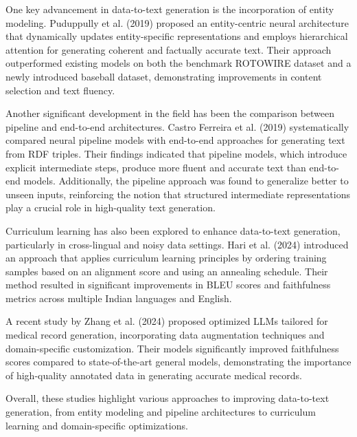 \documentclass[fleqn,moreauthors,10pt]{ds_report}
\begin{document}
One key advancement in data-to-text generation is the incorporation of entity modeling. Puduppully et al. (2019) \cite{puduppully2019datatotextgenerationentitymodeling} proposed an entity-centric neural architecture that dynamically updates entity-specific representations and employs hierarchical attention for generating coherent and factually accurate text. Their approach outperformed existing models on both the benchmark ROTOWIRE dataset and a newly introduced baseball dataset, demonstrating improvements in content selection and text fluency.

Another significant development in the field has been the comparison between pipeline and end-to-end architectures. Castro Ferreira et al. (2019) \cite{ferreira2019neuraldatatotextgenerationcomparison} systematically compared neural pipeline models with end-to-end approaches for generating text from RDF triples. Their findings indicated that pipeline models, which introduce explicit intermediate steps, produce more fluent and accurate text than end-to-end models. Additionally, the pipeline approach was found to generalize better to unseen inputs, reinforcing the notion that structured intermediate representations play a crucial role in high-quality text generation.

Curriculum learning has also been explored to enhance data-to-text generation, particularly in cross-lingual and noisy data settings. Hari et al. (2024) \cite{hari2024curriculumlearningcrosslingualdatatotext} introduced an approach that applies curriculum learning principles by ordering training samples based on an alignment score and using an annealing schedule. Their method resulted in significant improvements in BLEU scores and faithfulness metrics across multiple Indian languages and English.

A recent study by Zhang et al. (2024) \cite{zhang2025data} proposed optimized LLMs tailored for medical record generation, incorporating data augmentation techniques and domain-specific customization. Their models significantly improved faithfulness scores compared to state-of-the-art general models, demonstrating the importance of high-quality annotated data in generating accurate medical records. 

Overall, these studies highlight various approaches to improving data-to-text generation, from entity modeling and pipeline architectures to curriculum learning and domain-specific optimizations. 
\end{document}
